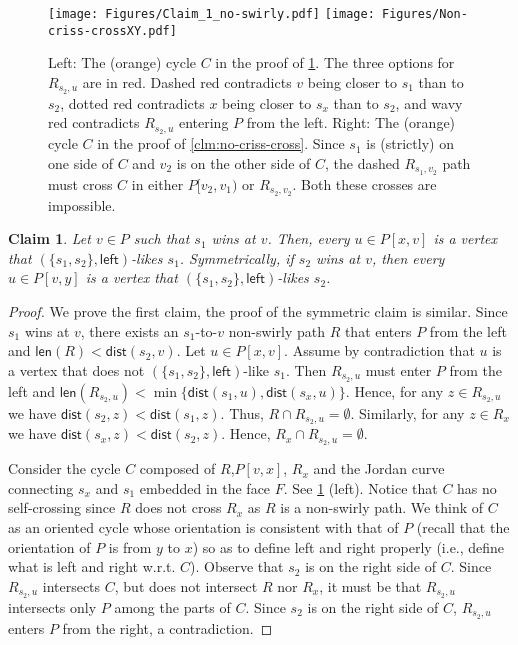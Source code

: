 \documentclass{article}
\newcommand{\leftside}{\mathsf{left}}
\newcommand{\dist}{\mathsf{dist}}
\newcommand{\len}{\mathsf{len}}
\newtheorem{claim}{Claim}
\begin{document}
\begin{figure}[htb]
     \centering
     \texttt{[image: Figures/Claim\_1\_no-swirly.pdf]}
     \hspace{1in}\texttt{[image: Figures/Non-criss-crossXY.pdf]}

     \caption{Left: The (orange) cycle $C$ in the proof of \cref{clm:winner_takes_something}. The three options for $R_{s_2,u}$ are in red. Dashed red contradicts $v$ being closer to $s_1$ than to $s_2$, dotted red contradicts $x$ being closer to $s_x$ than to $s_2$, and wavy red contradicts $R_{s_2,u}$ entering $P$ from the left. Right: The (orange) cycle $C$ in the proof of \cref{clm:no-criss-cross}. Since $s_1$ is (strictly) on one side of $C$ and $v_2$ is on the other side of $C$,  the dashed  $R_{s_1,v_2}$ path must cross $C$ in either  $P[v_2,v_1)$ or  $R_{s_2,v_2}$.
        Both these crosses are impossible.}
\label{fig:winner_takes_something}
 \end{figure}
\begin{claim} \label{clm:winner_takes_something}
Let $v\in P$ such that $s_1$ wins at $v$.
Then, every $u\in P[x,v]$ is a vertex that $(\{s_1,s_2\},\leftside)$-likes $s_1$.
Symmetrically, if $s_2$ wins at $v$, then every $u\in P[v,y]$ is a vertex that $(\{s_1,s_2\},\leftside)$-likes $s_2$.
\end{claim}
\begin{proof}
We prove the first claim, the proof of the symmetric claim is similar.
Since $s_1$ wins at $v$, there exists an $s_1$-to-$v$ non-swirly path $R$ that enters $P$ from the left and $\len(R)<\dist(s_2,v)$.
Let $u\in P[x,v]$.
Assume by contradiction that $u$ is a vertex that does not  $(\{s_1,s_2\},\leftside)$-like $s_1$.
Then $R_{s_2,u}$ must enter $P$ from the left and $\len(R_{s_2,u})<\min \{\dist(s_1,u),\dist(s_x,u)\}$.
Hence, for any $z\in R_{s_2,u}$ we have $\dist(s_2,z)<\dist(s_1,z)$.
Thus, $R\cap R_{s_2,u}=\emptyset$.
Similarly,  for any $z\in R_x$ we have $\dist(s_x,z)<\dist(s_2,z)$.
Hence, $R_x\cap R_{s_2,u}=\emptyset$.


Consider the cycle $C$ composed of $R$,$ P[v,x]$, $ R_x$ and the  Jordan curve connecting $s_x$ and $s_1$ embedded in the face $F$. See \cref{fig:winner_takes_something} (left).
Notice that $C$ has no self-crossing since $R$ does not cross $ R_x$ as $R$ is a non-swirly path.
We think of $C$ as an oriented cycle whose orientation is consistent with that of $P$ (recall that the orientation of $P$ is from $y$ to $x$) so as to define left and right properly (i.e., define what is left and right w.r.t. $C$).
Observe that $s_2$ is on the right side of $C$.
Since $R_{s_2,u}$ intersects $C$, but does not intersect $R$ nor $R_x$, it must be that $R_{s_2,u}$ intersects only $P$ among the parts of $C$.
Since $s_2$ is on the right side of $C$, $R_{s_2,u}$ enters $P$ from the right, a contradiction.
\end{proof}
\end{document}
